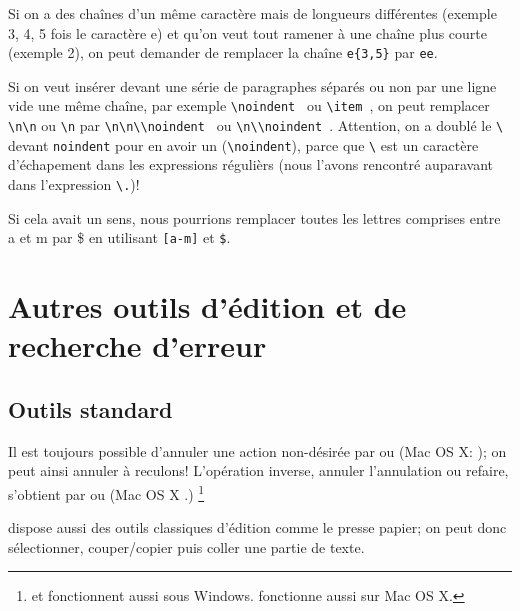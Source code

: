 Si on a des chaînes d'un même caractère mais de longueurs différentes (exemple 3, 4, 5 fois le caractère e) et qu'on veut tout ramener à une chaîne plus courte (exemple 2), on peut demander de remplacer la chaîne {\frq\verb+e{3,5}+\flq} par {\frq\verb+ee+\flq}.

Si on veut insérer devant une série de paragraphes séparés ou non par une ligne vide une même chaîne, par exemple {\frq\verb*+\noindent +\flq} ou {\frq\verb*+\item +\flq}, on peut remplacer {\frq\verb+\n\n+\flq} ou {\frq\verb+\n+\flq} par {\frq\verb*+\n\n\\noindent +\flq} ou {\frq\verb*+\n\\noindent +\flq}. Attention, on a doublé le \verb|\| devant \verb|noindent| pour en avoir un (\verb|\noindent|), parce que \verb|\| est un caractère d'échapement dans les expressions régulièrs (nous l'avons rencontré auparavant dans l'expression \verb|\.|)!

Si cela avait un sens, nous pourrions remplacer toutes les lettres comprises entre \og a\fg{} et \og m\fg{} par \og \$\fg{} en utilisant {\frq\verb+[a-m]+\flq} et {\frq\verb+$+\flq}.

\section{Autres outils d'édition et de recherche d'erreur}

\subsection{Outils standard}

Il est toujours possible d'annuler une action non-désirée par \submenu{} ou  (Mac OS X: ); on peut ainsi annuler à reculons! L'opération inverse, annuler l'annulation ou refaire, s'obtient par \submenu{} ou  (Mac OS X .) \footnote{ et  fonctionnent aussi sous Windows.  fonctionne aussi sur Mac OS X.} 

\Tw{} dispose aussi des outils classiques d'édition comme le presse papier; on peut donc sélectionner, couper/copier puis coller une partie de texte.

